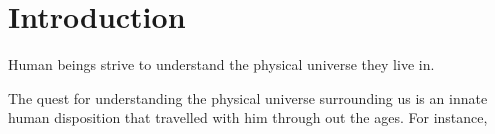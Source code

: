\chapter{Introduction}

Human beings strive to understand the physical universe they live in. 

The quest for understanding the physical universe surrounding us is an innate human disposition that travelled with him through out the ages. For instance, 
